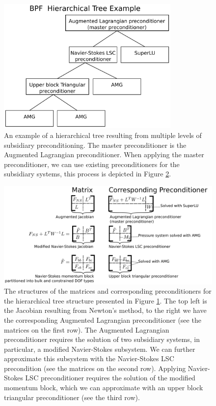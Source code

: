 \begin{figure}[H]
\centering
\includegraphics[width=0.8\textwidth]{./pic/bpf_hierarchy_tree_crop.pdf}
\caption{An example of a hierarchical tree resulting from multiple levels of
  subsidiary preconditioning. The master preconditioner is the Augmented
  Lagrangian preconditioner. When applying the master preconditioner, we can
  use existing preconditioners for the subsidiary systems, this process is
  depicted in Figure \ref{fig:bpf_hierarchy_matrixstructure_crop}.}
\label{fig:bpf_hierarchy_tree_crop}
\end{figure}

\begin{figure}[H]
\centering
\includegraphics[width=1\textwidth]{./pic/bpf_hierarchy_matrixstructure_crop.pdf}
\caption{The structures of the matrices and corresponding preconditioners for
  the hierarchical tree structure presented in Figure
  \ref{fig:bpf_hierarchy_tree_crop}. The top left is the Jacobian resulting
  from Newton's method, to the right we have the corresponding Augmented
  Lagrangian preconditioner (see the matrices on the first row). The Augmented
  Lagrangian preconditioner requires the solution of two subsidiary systems, in
  particular, a modified Navier-Stokes subsystem. We can further approximate
  this subsystem with the Navier-Stokes LSC precondition (see the matrices on
  the second row). Applying Navier-Stokes LSC preconditioner requires the
  solution of the modified momentum block, which we can approximate with an
  upper block triangular preconditioner (see the third row).}
\label{fig:bpf_hierarchy_matrixstructure_crop}
\end{figure}



